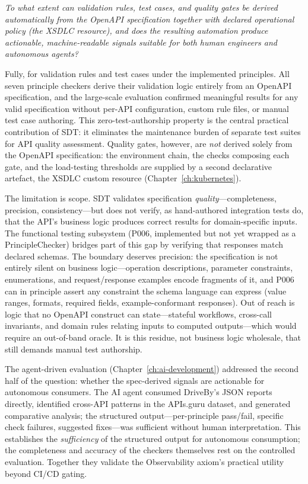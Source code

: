 \textit{To what extent can validation rules, test cases, and quality gates be derived automatically from the OpenAPI specification together with declared operational policy (the XSDLC resource), and does the resulting automation produce actionable, machine-readable signals suitable for both human engineers and autonomous agents?}

Fully, for validation rules and test cases under the implemented principles. All seven principle checkers derive their validation logic entirely from an OpenAPI specification, and the large-scale evaluation confirmed meaningful results for any valid specification without per-API configuration, custom rule files, or manual test case authoring. This zero-test-authorship property is the central practical contribution of SDT: it eliminates the maintenance burden of separate test suites for API quality assessment. Quality gates, however, are \emph{not} derived solely from the OpenAPI specification: the environment chain, the checks composing each gate, and the load-testing thresholds are supplied by a second declarative artefact, the XSDLC custom resource (Chapter~\ref{ch:kubernetes}).

The limitation is scope. SDT validates specification \textit{quality}---completeness, precision, consistency---but does not verify, as hand-authored integration tests do, that the API's business logic produces correct results for domain-specific inputs. The functional testing subsystem (P006, implemented but not yet wrapped as a PrincipleChecker) bridges part of this gap by verifying that responses match declared schemas. The boundary deserves precision: the specification is not entirely silent on business logic---operation descriptions, parameter constraints, enumerations, and request/response examples encode fragments of it, and P006 can in principle assert any constraint the schema language can express (value ranges, formats, required fields, example-conformant responses). Out of reach is logic that no OpenAPI construct can state---stateful workflows, cross-call invariants, and domain rules relating inputs to computed outputs---which would require an out-of-band oracle. It is this residue, not business logic wholesale, that still demands manual test authorship.

The agent-driven evaluation (Chapter~\ref{ch:ai-development}) addressed the second half of the question: whether the spec-derived signals are actionable for autonomous consumers. The AI agent consumed DriveBy's JSON reports directly, identified cross-API patterns in the APIs.guru dataset, and generated comparative analysis; the structured output---per-principle pass/fail, specific check failures, suggested fixes---was sufficient without human interpretation. This establishes the \emph{sufficiency} of the structured output for autonomous consumption; the completeness and accuracy of the checkers themselves rest on the controlled evaluation. Together they validate the Observability axiom's practical utility beyond CI/CD gating.

